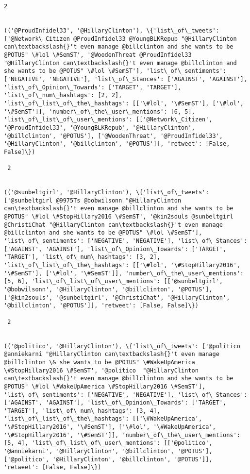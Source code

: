 \documentclass[11pt]{article}
\begin{document}
\begin{Verbatim}[commandchars=\\\{\}]
 2
 

(('@ProudInfidel33', '@HillaryClinton'), \{'list\_of\_tweets': ['@Network\_Citizen @ProudInfidel33 @YoungBLKRepub "@HillaryClinton can\textbackslash{}'t even manage @billclinton and she wants to be @POTUS" \#lol \#SemST', '@WoodenThreat @ProudInfidel33 "@HillaryClinton can\textbackslash{}'t even manage @billclinton and she wants to be @POTUS" \#lol \#SemST'], 'list\_of\_sentiments': ['NEGATIVE', 'NEGATIVE'], 'list\_of\_Stances': ['AGAINST', 'AGAINST'], 'list\_of\_Opinion\_Towards': ['TARGET', 'TARGET'], 'list\_of\_num\_hashtags': [2, 2], 'list\_of\_list\_of\_the\_hashtags': [['\#lol', '\#SemST'], ['\#lol', '\#SemST']], 'number\_of\_the\_user\_mentions': [6, 5], 'list\_of\_list\_of\_user\_mentions': [['@Network\_Citizen', '@ProudInfidel33', '@YoungBLKRepub', '@HillaryClinton', '@billclinton', '@POTUS'], ['@WoodenThreat', '@ProudInfidel33', '@HillaryClinton', '@billclinton', '@POTUS']], 'retweet': [False, False]\})

 2
 

(('@sunbeltgirl', '@HillaryClinton'), \{'list\_of\_tweets': ['@sunbeltgirl @9975Ts @bobwilsonn "@HillaryClinton can\textbackslash{}'t even manage @billclinton and she wants to be @POTUS" \#lol \#StopHillary2016 \#SemST', '@kin2souls @sunbeltgirl @ChristiChat "@HillaryClinton can\textbackslash{}'t even manage @billclinton and she wants to be @POTUS" \#lol \#SemST'], 'list\_of\_sentiments': ['NEGATIVE', 'NEGATIVE'], 'list\_of\_Stances': ['AGAINST', 'AGAINST'], 'list\_of\_Opinion\_Towards': ['TARGET', 'TARGET'], 'list\_of\_num\_hashtags': [3, 2], 'list\_of\_list\_of\_the\_hashtags': [['\#lol', '\#StopHillary2016', '\#SemST'], ['\#lol', '\#SemST']], 'number\_of\_the\_user\_mentions': [5, 6], 'list\_of\_list\_of\_user\_mentions': [['@sunbeltgirl', '@bobwilsonn', '@HillaryClinton', '@billclinton', '@POTUS'], ['@kin2souls', '@sunbeltgirl', '@ChristiChat', '@HillaryClinton', '@billclinton', '@POTUS']], 'retweet': [False, False]\})

 2
 

(('@politico', '@HillaryClinton'), \{'list\_of\_tweets': ['@politico @anniekarni "@HillaryClinton can\textbackslash{}'t even manage @billclinton \& she wants to be @POTUS" \#WakeUpAmerica \#StopHillary2016 \#SemST', '@politico  "@HillaryClinton can\textbackslash{}'t even manage @billclinton and she wants to be @POTUS" \#lol \#WakeUpAmerica \#StopHillary2016 \#SemST'], 'list\_of\_sentiments': ['NEGATIVE', 'NEGATIVE'], 'list\_of\_Stances': ['AGAINST', 'AGAINST'], 'list\_of\_Opinion\_Towards': ['TARGET', 'TARGET'], 'list\_of\_num\_hashtags': [3, 4], 'list\_of\_list\_of\_the\_hashtags': [['\#WakeUpAmerica', '\#StopHillary2016', '\#SemST'], ['\#lol', '\#WakeUpAmerica', '\#StopHillary2016', '\#SemST']], 'number\_of\_the\_user\_mentions': [5, 4], 'list\_of\_list\_of\_user\_mentions': [['@politico', '@anniekarni', '@HillaryClinton', '@billclinton', '@POTUS'], ['@politico', '@HillaryClinton', '@billclinton', '@POTUS']], 'retweet': [False, False]\})


\end{Verbatim}
\end{document}
